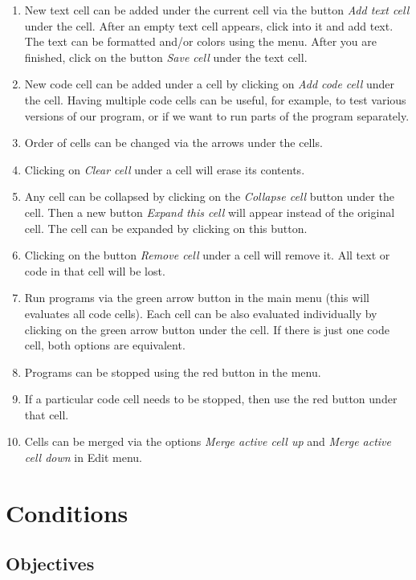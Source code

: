 \documentclass[article,A4,12pt]{llncs}
\begin{document}
\begin{enumerate} 
\item New text cell can be added under the current cell via the button 
      {\em Add text cell} under the cell. 
      After an empty text cell appears, click into it and add text. The text can be 
      formatted and/or colors using the menu. After you are finished, click 
      on the button {\em Save cell} under the text cell. 
\item New code cell can be added under a cell by clicking on {\em Add code cell} 
      under the cell. Having multiple code cells can be useful, for example, to test various versions 
      of our program, or if we want to run parts of the program separately. 
\item Order of cells can be changed via the arrows under the cells.
\item Clicking on {\em Clear cell} under a cell will erase its contents.
\item Any cell can be collapsed by clicking on the {\em Collapse cell} button
      under the cell. Then a new button {\em Expand this cell} will appear instead
      of the original cell. The cell can be expanded by clicking on this button.
\item Clicking on the button {\em Remove cell} under a cell will remove it. 
      All text or code in that cell will be lost.
\item Run programs via the green arrow button in the main menu (this will evaluates all code
      cells). Each cell can be also evaluated individually by clicking on the green 
      arrow button under the cell. If there is just one code cell, both options 
      are equivalent.
\item Programs can be stopped using the red button in the menu. 
\item If a particular
      code cell needs to be stopped, then use the red button under that cell.
\item Cells can be merged via the options {\em Merge active cell up} and 
      {\em Merge active cell down} in Edit menu.
\end{enumerate}


\section{Conditions} \label{sec:cond}

\subsection{Objectives} 
\end{document}
